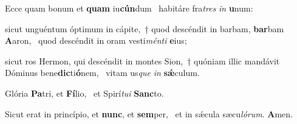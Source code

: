 \item Ecce quam bonum et \textbf{quam} iu\textbf{cún}dum~\psstar{} habitáre fra\textit{tres} \textit{in} \textbf{u}num:

\item sicut unguéntum óptimum in cápite,~† quod descéndit in barbam, \textbf{bar}bam \textbf{A}aron,~\psstar{} quod descéndit in oram vesti\textit{ménti} \textbf{e}ius;

\item sicut ros Hermon, qui descéndit in montes Sion,~† quóniam illic mandávit Dóminus bene\textbf{dic}ti\textbf{ó}nem,~\psstar{} vitam us\textit{que} \textit{in} \textbf{sǽ}culum.

\item Glória \textbf{Pa}tri, et \textbf{Fí}lio,~\psstar{} et Spirí\textit{tui} \textbf{Sanc}to.

\item Sicut erat in princípio, et \textbf{nunc}, et \textbf{sem}per,~\psstar{} et in sǽcula sæcu\textit{lórum}. \textbf{A}men.